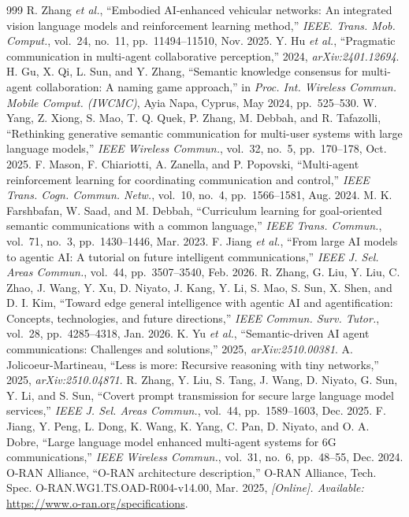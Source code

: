 \begin{thebibliography}{999}
 R. Zhang \emph{et al.}, ``Embodied AI-enhanced vehicular networks: An integrated vision language models and reinforcement learning method,'' \emph{IEEE. Trans. Mob. Comput.}, vol.~24, no.~11, pp.~11494--11510, Nov. 2025.
 Y. Hu \emph{et al.}, ``Pragmatic communication in multi-agent collaborative perception,'' 2024, \emph{arXiv:2401.12694}.
 H. Gu, X. Qi, L. Sun, and Y. Zhang, ``Semantic knowledge consensus for multi-agent collaboration: A naming game approach,'' in \emph{Proc. Int. Wireless Commun. Mobile Comput. (IWCMC)}, Ayia Napa, Cyprus, May 2024, pp.~525--530.
 W. Yang, Z. Xiong, S. Mao, T. Q. Quek, P. Zhang, M. Debbah, and R. Tafazolli, ``Rethinking generative semantic communication for multi-user systems with large language models,'' \emph{IEEE Wireless Commun.}, vol.~32, no.~5, pp.~170--178, Oct. 2025.
 F. Mason, F. Chiariotti, A. Zanella, and P. Popovski, ``Multi-agent reinforcement learning for coordinating communication and control,'' \emph{IEEE Trans. Cogn. Commun. Netw.}, vol.~10, no.~4, pp.~1566--1581, Aug. 2024.
 M. K. Farshbafan, W. Saad, and M. Debbah, ``Curriculum learning for goal-oriented semantic communications with a common language,'' \emph{IEEE Trans. Commun.}, vol.~71, no.~3, pp.~1430--1446, Mar. 2023.
 F. Jiang \emph{et al.}, ``From large AI models to agentic AI: A tutorial on future intelligent communications,'' \emph{IEEE J. Sel. Areas Commun.}, vol.~44, pp.~3507--3540, Feb. 2026.
 R. Zhang, G. Liu, Y. Liu, C. Zhao, J. Wang, Y. Xu, D. Niyato, J. Kang, Y. Li, S. Mao, S. Sun, X. Shen, and D. I. Kim, ``Toward edge general intelligence with agentic AI and agentification: Concepts, technologies, and future directions,'' \emph{IEEE Commun. Surv. Tutor.}, vol.~28, pp.~4285--4318, Jan. 2026.
 K. Yu \emph{et al.}, ``Semantic-driven AI agent communications: Challenges and solutions,'' 2025, \emph{arXiv:2510.00381}.
 A. Jolicoeur-Martineau, ``Less is more: Recursive reasoning with tiny networks,'' 2025, \emph{arXiv:2510.04871}.
 R. Zhang, Y. Liu, S. Tang, J. Wang, D. Niyato, G. Sun, Y. Li, and S. Sun, ``Covert prompt transmission for secure large language model services,'' \emph{IEEE J. Sel. Areas Commun.}, vol.~44, pp.~1589--1603, Dec. 2025.
 F. Jiang, Y. Peng, L. Dong, K. Wang, K. Yang, C. Pan, D. Niyato, and O. A. Dobre, ``Large language model enhanced multi-agent systems for 6G communications,'' \emph{IEEE Wireless Commun.}, vol.~31, no.~6, pp.~48--55, Dec. 2024.
 O-RAN Alliance, ``O-RAN architecture description,'' O-RAN Alliance, Tech. Spec. O-RAN.WG1.TS.OAD-R004-v14.00, Mar. 2025, \emph{[Online]. Available:} \url{https://www.o-ran.org/specifications}.

\end{thebibliography}
